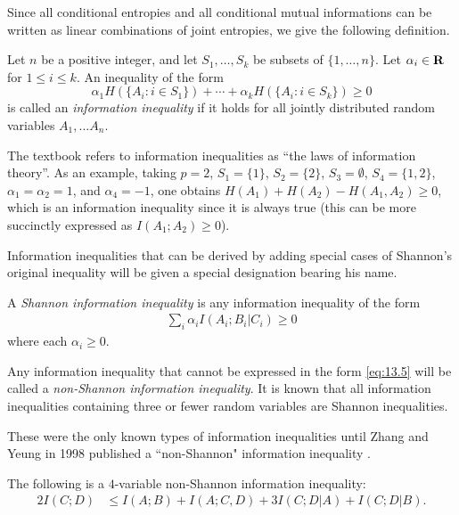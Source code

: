 \documentclass[10pt,journal]{IEEEtran}
\begin{document}
Since all conditional entropies and all conditional mutual informations
can be written as linear combinations of joint entropies, we give the following
definition.
\begin{definition}
Let $n$ be a positive integer,
and let $S_1, \ldots, S_k$ be subsets of $\{1, \ldots, n\}$.
Let $\alpha_i\in\mathbf{R}$ for $1\le i \le k$.
An inequality of the form
$$
\alpha_1 H( \{A_i: i\in S_1\}) + \cdots + \alpha_k H( \{A_i: i\in S_k\}) \ge 0
$$
is called an \textit{information inequality}
if it holds for all jointly distributed random variables $A_1, \ldots  A_n$.
\label{def:1}
\end{definition}
The textbook \cite{Yeung-book} %
refers to information inequalities as
``the laws of information theory''.
As an example,
taking
$p=2$,
$S_1 = \{1\}$,
$S_2 = \{2\}$,
$S_3 = \emptyset$,
$S_4 = \{1,2\}$,
$\alpha_1 = \alpha_2 = 1$,
and $\alpha_4 = -1$,
one obtains
$H(A_1) + H(A_2) - H(A_1,A_2) \ge 0$,
which is an information inequality since it is always true
(this can be more succinctly expressed as $I(A_1;A_2) \ge 0$).

Information inequalities that can be derived
by adding special cases of Shannon's original
inequality will be given a special designation bearing his name.

\begin{definition}
A \textit{Shannon information inequality}
is any information inequality of the form
%
\begin{align}
\sum_i \alpha_i I(A_i;B_i|C_i) \ge 0
\label{eq:13.5}
\end{align}
%
where each $\alpha_i\geq 0$.
\end{definition}

Any information inequality that cannot be
expressed in the form \eqref{eq:13.5}
will be called a \textit{non-Shannon information inequality}.
It is known \cite[p.~308]{Yeung-book} %
that all information inequalities containing three or fewer random variables are Shannon inequalities.

These were the only known types of information inequalities until
Zhang and Yeung in 1998 published a ``non-Shannon" information inequality
\cite{Zhang-Yeung-July98} \cite[Theorem 14.7 on p.310]{Yeung-book}.
\begin{theorem}
The following is a $4$-variable non-Shannon information inequality:
%
\begin{align*}
2I(C;D) &\le I(A;B){+}I(A;C,D){+}3I(C;D|A){+}I(C;D|B).
\end{align*}
%
\label{thm:Zhang-Yeung}
\end{theorem}
%
\end{document}
